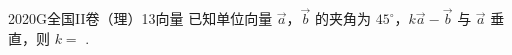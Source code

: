 
\begin{problem}{2020}{G}{全国II卷（理）}{13}{向量}
已知单位向量 $ \vec{a} $，$ \vec{b} $ 的夹角为 $ 45^\circ $，$ k\vec{a} - \vec{b} $ 与 $ \vec{a} $ 垂直，则 $ k = $ \underline{\hspace{4em}}.
\end{problem}

\begin{answer}

\end{answer}

\begin{solutions}

\end{solutions}